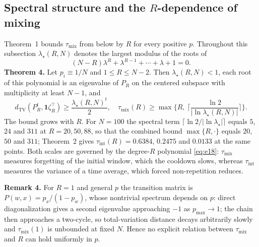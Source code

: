\documentclass[twoside,11pt]{article}
\begin{document}
\subsection{\texorpdfstring{Spectral structure and the $R$-dependence of mixing}{Spectral structure and the R-dependence of mixing}}
Theorem~1 bounds $\tau_{\mathrm{mix}}$ from below by $R$ for every positive $p$. Throughout this subsection $\lambda_\star(R,N)$ denotes the largest modulus of the roots of
\begin{equation}\label{eq:e18}
(N-R)\lambda^{R}+\lambda^{R-1}+\cdots+\lambda+1=0 .
\end{equation}
\textbf{Theorem 4.} Let $p_i\equiv1/N$ and $1\leq R\leq N-2$. Then $\lambda_\star(R,N)<1$, each root of this polynomial is an eigenvalue of $P_R$ on the centered subspace with multiplicity at least $N-1$, and
\begin{equation}\label{eq:e19}
d_{\mathrm{TV}}(P_R^{t},\mathbf{1}\zeta_R^{\top}) \geq \dfrac{\lambda_\star(R,N)^{t}}{2},\quad \tau_{\mathrm{mix}}(R) \geq \max\Big\{R,\ \Big\lceil\dfrac{\ln2}{|\ln\lambda_\star(R,N)|}\Big\rceil\Big\}.
\end{equation}
The bound grows with $R$. For $N=100$ the spectral term $\lceil\ln2/|\ln\lambda_\star|\rceil$ equals $5$, $24$ and $311$ at $R=20,50,88$, so that the combined bound $\max\{R,\cdot\}$ equals $20$, $50$ and $311$; Theorem~2 gives $\tau_{\mathrm{int}}(R)=0.6384$, $0.2475$ and $0.0133$ at the same points. Both scales are governed by the degree-$R$ polynomial \eqref{eq:e18}: $\tau_{\mathrm{mix}}$ measures forgetting of the initial window, which the cooldown slows, whereas $\tau_{\mathrm{int}}$ measures the variance of a time average, which forced non-repetition reduces.

\textbf{Remark 4.} For $R=1$ and general $p$ the transition matrix is $P(w,x)=p_x/(1-p_w)$, whose nontrivial spectrum depends on $p$: direct diagonalization gives a second eigenvalue approaching $-1$ as $p_{\max}\to1$; the chain then approaches a two-cycle, so total-variation distance decays arbitrarily slowly and $\tau_{\mathrm{mix}}(1)$ is unbounded at fixed $N$. Hence no explicit relation between $\tau_{\mathrm{mix}}$ and $R$ can hold uniformly in $p$.
\end{document}
